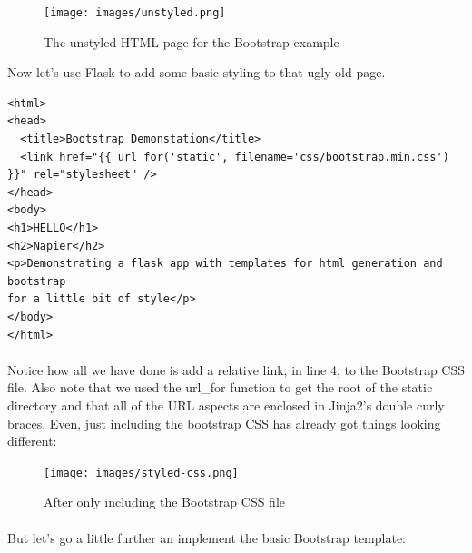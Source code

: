 \documentclass[12pt, a4paper, oneside]{book}
\begin{document}
\begin{figure}[H]
\centering
\texttt{[image: images/unstyled.png]}
\caption{The unstyled HTML page for the Bootstrap example}
\label{fig:unstyled}
\end{figure}

Now let's use Flask to add some basic styling to that ugly old page.

\begin{lstlisting}
<html>
<head>
  <title>Bootstrap Demonstation</title>
  <link href="{{ url_for('static', filename='css/bootstrap.min.css') }}" rel="stylesheet" />
</head>
<body>
<h1>HELLO</h1>
<h2>Napier</h2>
<p>Demonstrating a flask app with templates for html generation and bootstrap
for a little bit of style</p>
</body>
</html>
\end{lstlisting}

\paragraph{} Notice how all we have done is add a relative link, in line 4, to the Bootstrap CSS file. Also note that we used the url\_for function to get the root of the static directory and that all of the URL aspects are enclosed in Jinja2's double curly braces.  Even, just including the bootstrap CSS has already got things looking different:

\begin{figure}[H]
\centering
\texttt{[image: images/styled-css.png]}
\caption{After only including the Bootstrap CSS file}
\label{fig:styled-css}
\end{figure}

\paragraph{} But let's go a little further an implement the basic Bootstrap template:
\end{document}
